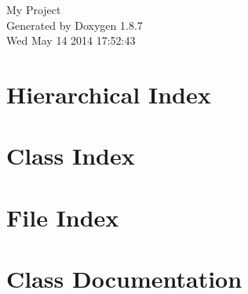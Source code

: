 \documentclass[twoside]{book}
\newcommand{\+}{\discretionary{\mbox{\scriptsize$\hookleftarrow$}}{}{}}
\newcommand{\clearemptydoublepage}{%
  \newpage{\pagestyle{empty}\cleardoublepage}%
}
\begin{document}
\hypersetup{pageanchor=false,
             bookmarks=true,
             bookmarksnumbered=true,
             pdfencoding=unicode
            }
\begin{titlepage}
\vspace*{7cm}
\begin{center}%
{\Large My Project }\\
\vspace*{1cm}
{\large Generated by Doxygen 1.8.7}\\
\vspace*{0.5cm}
{\small Wed May 14 2014 17:52:43}\\
\end{center}
\end{titlepage}
\clearemptydoublepage
\tableofcontents
\clearemptydoublepage
{}
\hypersetup{pageanchor=true}

\chapter{Hierarchical Index}

\chapter{Class Index}

\chapter{File Index}

\chapter{Class Documentation}
































\end{document}

